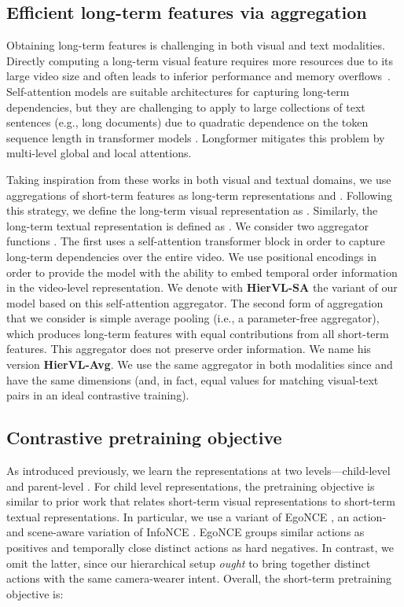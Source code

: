 \documentclass[10pt,twocolumn,letterpaper]{article}
\begin{document}
\subsection{Efficient long-term features via aggregation}
\label{sec:clip-agg}

Obtaining long-term features is challenging in both visual and text modalities. Directly computing a long-term visual feature requires more resources due to its large video size and often leads to inferior performance and memory overflows~\cite{memvit,ltfb,clip-hitchhiker,scsampler}. Self-attention models are suitable architectures for capturing long-term dependencies, but they are challenging to apply to large collections of text sentences (e.g., long documents)
due to quadratic dependence on the token sequence length in transformer models \cite{bert}. Longformer \cite{longformer} mitigates this problem by multi-level global and local attentions. 

Taking inspiration from these works in both visual and textual domains, we use aggregations of short-term features as long-term representations  and . Following this strategy, we define the long-term visual representation  as . Similarly, the long-term textual representation  is defined as . We consider two aggregator functions . The first uses a self-attention transformer block in order to capture long-term dependencies over the entire video. We use positional encodings in order to provide the model with the ability to embed temporal order information in the video-level representation. We denote with \textbf{HierVL-SA} the variant of our model based on this self-attention aggregator. The second form of aggregation that we consider is simple average pooling (i.e., a parameter-free aggregator), which produces long-term features with equal contributions from all short-term features. This aggregator does not preserve order information. We name his version \textbf{HierVL-Avg}. We use the same aggregator in both modalities since  and  have the same dimensions (and, in fact, equal values for matching visual-text pairs in an ideal contrastive training).








\subsection{Contrastive pretraining objective}
\label{contrastive}

As introduced previously, we learn the representations at two levels---child-level  and parent-level . For child level representations, the pretraining objective is similar to prior work \cite{howto100m,egovlp,mil-nce,videoclip} that relates short-term visual representations to short-term textual representations. In particular, we use a variant of EgoNCE \cite{egovlp}, an action- and scene-aware variation of InfoNCE \cite{infonce}. EgoNCE groups similar actions as positives and temporally close distinct actions as hard negatives. In contrast, we omit the latter, since our hierarchical setup \emph{ought} to bring together distinct actions with the same camera-wearer intent. 
  Overall, the short-term pretraining objective is:
\end{document}
